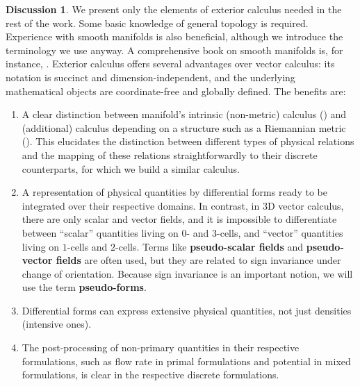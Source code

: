 \documentclass{elsarticle}
\theoremstyle{definition}
\newtheorem{discussion}[theorem]{Discussion}
\newcommand{\newterm}[1]{\textbf{#1}}
\begin{document}
\begin{discussion}
  We present only the elements of exterior calculus needed in the rest of the work.
  Some basic knowledge of general topology is required.
  Experience with smooth manifolds is also beneficial, although we introduce the terminology we use anyway.
  A comprehensive book on smooth manifolds is, for instance, \cite{lee2012introduction}.
  Exterior calculus offers several advantages over vector calculus: its notation is succinct and dimension-independent, and the underlying mathematical objects are coordinate-free and globally defined.
  The benefits are:
  \begin{enumerate}
    \item
      A clear distinction between manifold's intrinsic (non-metric) calculus () and (additional) calculus depending on a structure such as a Riemannian metric ().
      This elucidates the distinction between different types of physical relations and the mapping of these relations straightforwardly to their discrete counterparts, for which we build a similar calculus.
    \item
      A representation of physical quantities by differential forms ready to be integrated over their respective domains.
      In contrast, in $3$D vector calculus, there are only scalar and vector fields, and it is impossible to differentiate between ``scalar'' quantities living on $0$- and $3$-cells, and ``vector'' quantities living on $1$-cells and $2$-cells.
      Terms like \newterm{pseudo-scalar fields} and \newterm{pseudo-vector fields} are often used, but they are related to sign invariance under change of orientation. Because sign invariance is an important notion, we will use the term \newterm{pseudo-forms}.
    \item
      Differential forms can express extensive physical quantities, not just densities (intensive ones).
    \item
      The post-processing of non-primary quantities in their respective formulations, such as flow rate in primal formulations and potential in mixed formulations, is clear in the respective discrete formulations.
  \end{enumerate}
\end{discussion}
\end{document}
